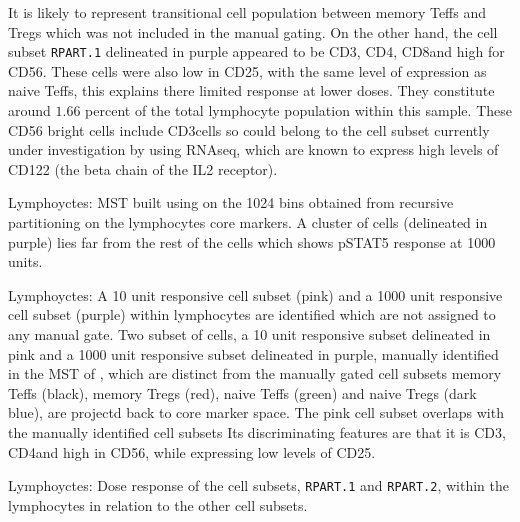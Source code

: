 It is likely to represent transitional cell population between memory Teffs and Tregs which was not included in the manual gating.
On the other hand, the cell subset \texttt{RPART.1} delineated in purple appeared to be CD3\negative, CD4\negative, CD8\negative and high for CD56.
These cells were also low in CD25, with the same level of expression as naive Teffs, this explains there limited response at lower doses.
They constitute around $1.66$ percent of the total lymphocyte population within this sample.
These CD56 bright cells include CD3\negative cells so could belong to the cell subset currently under investigation by  using RNAseq,
which are known to express high levels of CD122 (the beta chain of the IL2 receptor).


%
{ Lymphoyctes: MST built using on the 1024 bins obtained from recursive partitioning on the lymphocytes core markers.}
{
  A cluster of cells (delineated in purple) lies far from the rest of the cells which shows pSTAT5 response at 1000 units.
}

{  Lymphoyctes: A 10 unit responsive cell subset (pink) and a 1000 unit responsive cell subset (purple) within lymphocytes are identified which are not assigned to any manual gate.  }
{
  Two subset of cells, a 10 unit responsive subset delineated in pink and a 1000 unit responsive subset delineated in purple,
  manually identified in the MST of ,
  which are distinct from the manually gated cell subsets memory Teffs (black), memory Tregs (red), naive Teffs (green) and naive Tregs (dark blue),
  are projectd back to core marker space.
  The pink cell subset overlaps with the manually identified cell subsets
  Its discriminating features are that it is CD3\negative, CD4\negative and high in CD56, while expressing low levels of CD25.
}

{  Lymphoyctes: Dose response of the cell subsets, \texttt{RPART.1} and \texttt{RPART.2}, within the lymphocytes in relation to the other cell subsets. }
{ }

